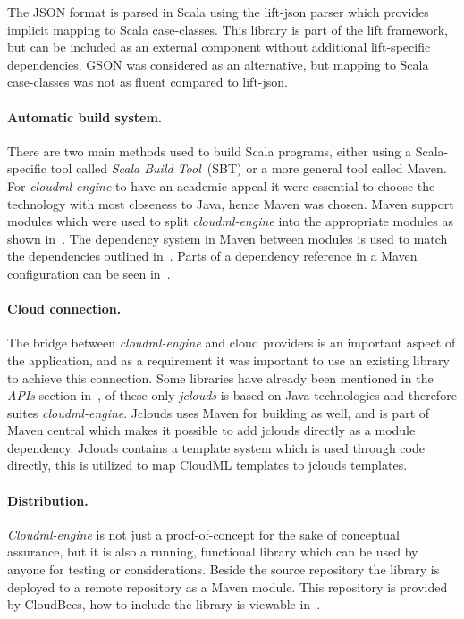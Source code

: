 The JSON format is parsed in Scala using the lift-json parser which provides implicit
mapping to Scala case-classes. This library is part of the lift framework,
but can be included as an external component without additional lift-specific dependencies.
GSON was considered as an alternative, but mapping to Scala case-classes was not as 
fluent compared to lift-json.

\paragraph{Automatic build system.}
There are two main methods used to build Scala programs, either using a Scala-specific tool called 
\emph{Scala Build Tool}~(SBT) or a more general tool called Maven. 
For \emph{cloudml-engine} to have an academic appeal it were essential to choose the technology
with most closeness to Java, hence Maven was chosen.
Maven support modules which were used to split \emph{cloudml-engine} into the appropriate 
modules as shown in~. 
The dependency system in Maven between modules is used to match the dependencies outlined in~.
Parts of a dependency reference in a Maven configuration can be seen in~.

\paragraph{Cloud connection.}
The bridge between \emph{cloudml-engine} and cloud providers is an important aspect of the application, and as a requirement
it was important to use an existing library to achieve this connection.
Some libraries have already been mentioned in the \emph{APIs} section in~,
of these only \emph{jclouds} is based on Java-technologies and therefore suites \emph{cloudml-engine}.
Jclouds uses Maven for building as well, and is part of Maven central which makes 
it possible to add jclouds directly as a module dependency.
Jclouds contains a template system which is used through code directly, this is utilized 
to map CloudML templates to jclouds templates.

\paragraph{Distribution.}
\emph{Cloudml-engine} is not just a proof-of-concept for the sake of conceptual assurance, but it is 
also a running, functional library which can be used by anyone for testing or considerations.
Beside the source repository\cite{cloudml-engine} the library is deployed to a remote repository
\cite{cloudbees-cloudml-engine} as a Maven module.
This repository is provided by CloudBees, 
how to include the library is viewable in~.

